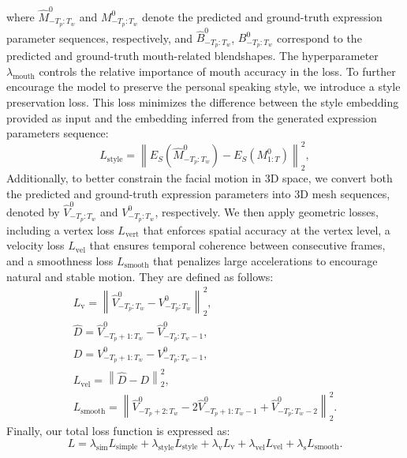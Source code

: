 \documentclass[a4paper, 10pt, conference]{ieeeconf}      %
\begin{document}
where \( \hat{M}_{-T_p:T_w}^0 \) and \( M_{-T_p:T_w}^0 \) denote the predicted and ground-truth expression parameter sequences, respectively, and \( \hat{B}_{-T_p:T_w}^0 \), \( B_{-T_p:T_w}^0 \) correspond to the predicted and ground-truth mouth-related blendshapes. The hyperparameter \( \lambda_{\text{mouth}} \) controls the relative importance of mouth accuracy in the loss.
To further encourage the model to preserve the personal speaking style, we introduce a style preservation loss. This loss minimizes the difference between the style embedding provided as input and the embedding inferred from the generated expression parameters sequence:
\begin{equation}
L_{\text{style}} = \left\| E_S(\hat{M}_{-T_p:T_w}^0) - E_S(M_{1:T}^0) \right\|_2^2,
\end{equation}
Additionally, to better constrain the facial motion in 3D space, we convert both the predicted and ground-truth expression parameters into 3D mesh sequences, denoted by \( \hat{V}_{-T_p:T_w}^0 \) and \( V_{-T_p:T_w}^0 \), respectively. We then apply geometric losses, including a vertex loss \( L_{\text{vert}} \) that enforces spatial accuracy at the vertex level, a velocity loss \( L_{\text{vel}} \) that ensures temporal coherence between consecutive frames, and a smoothness loss \( L_{\text{smooth}} \) that penalizes large accelerations to encourage natural and stable motion.
They are defined as follows:
\begin{gather}
L_{\text{v}} = \left\| \hat{V}_{-T_p:T_w}^0 - V_{-T_p:T_w}^0 \right\|_2^2, \\
\hat{D} = \hat{V}_{-T_p+1:T_w}^0 - \hat{V}_{-T_p:T_w-1}^0, \\
D = V_{-T_p+1:T_w}^0 - V_{-T_p:T_w-1}^0, \\
L_{\text{vel}} = \left\| \hat{D} - D \right\|_2^2, \\
L_{\text{smooth}} = \left\| \hat{V}_{-T_p+2:T_w}^0 - 2\hat{V}_{-T_p+1:T_w-1}^0 + \hat{V}_{-T_p:T_w-2}^0 \right\|_2^2.
\end{gather}
Finally, our total loss function is expressed as:
\begin{equation}
L =  \lambda_{\text{sim}}L_{\text{simple}} + \lambda_{\text{style}} L_{\text{style}} + \lambda_{\text{v}} L_{\text{v}} + \lambda_{\text{vel}} L_{\text{vel}} + \lambda_{\text{s}} L_{\text{smooth}} .
\end{equation}
\noindent
\end{document}
